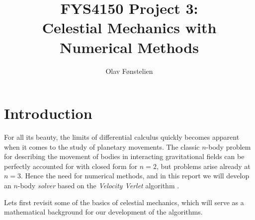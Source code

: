 \documentclass[]{article}
\title{FYS4150 Project 3:\\Celestial Mechanics with Numerical Methods}
\author{Olav Fønstelien}
\begin{document}
\maketitle

\begin{abstract}


\end{abstract}


\section{Introduction} \label{intro}
For all its beauty, the limits of differential calculus quickly becomes apparent when it comes to the study of planetary movements. The classic $n$-body problem for describing the movement of bodies in interacting gravitational fields can be perfectly accounted for with closed form for $n=2$, but problems arise already at $n=3$. Hence the need for numerical methods, and in this report we will develop an $n$-body \textit{solver} based on the \textit{Velocity Verlet} algorithm \cite{fys4150-notes}. 

Lets first revisit some of the basics of celestial mechanics, which will serve as a mathematical background for our development of the algorithms.
\end{document}
